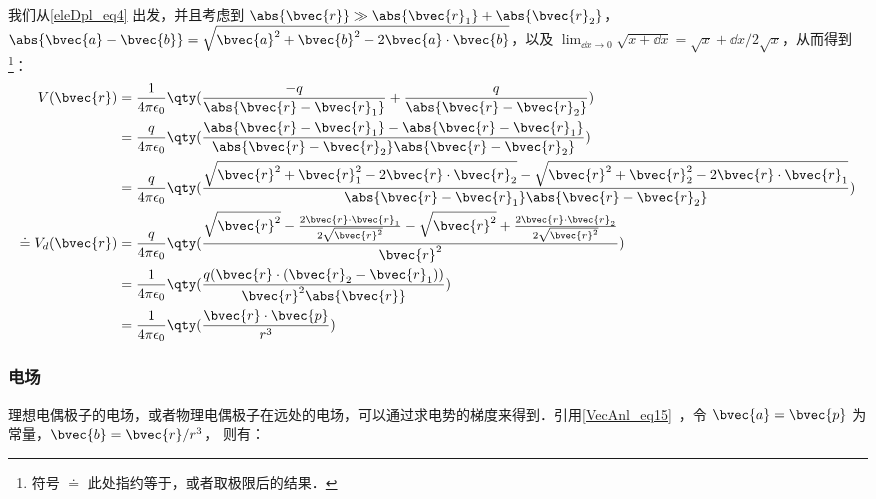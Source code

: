 我们从\autoref{eleDpl_eq4} 出发，并且考虑到 $\abs{\bvec{r}}\gg\\\abs{\bvec{r}_1}+\abs{\bvec{r}_2}$，$\abs{\bvec{a}-\bvec{b}}=\sqrt{\bvec{a}^2+\bvec{b}^2-2\bvec{a}\cdot\bvec{b}}$，以及 $\lim_{\dd x\rightarrow 0}\sqrt{x+\dd x}=\sqrt{x}+\dd x/2\sqrt{x}$，从而得到\footnote{符号 $\doteq$ 此处指约等于，或者取极限后的结果．}：
\begin{equation}
\begin{aligned}
V(\bvec{r})&=\frac{1}{4\pi\epsilon_0}\qty(\frac{-q}{\abs{\bvec{r}-\bvec{r}_1}}+\frac{q}{\abs{\bvec{r}-\bvec{r}_2}})\\
&=\frac{q}{4\pi\epsilon_0}\qty(\frac{\abs{\bvec{r}-\bvec{r}_1}-\abs{\bvec{r}-\bvec{r}_1}}{\abs{\bvec{r}-\bvec{r}_2}\abs{\bvec{r}-\bvec{r}_2}})\\
&=\frac{q}{4\pi\epsilon_0}\qty(\frac{\sqrt{\bvec{r}^2+\bvec{r}_1^2-2\bvec{r}\cdot\bvec{r}_2}-\sqrt{\bvec{r}^2+\bvec{r}_2^2-2\bvec{r}\cdot\bvec{r}_1}}{\abs{\bvec{r}-\bvec{r}_1}\abs{\bvec{r}-\bvec{r}_2}})\\
\doteq V_d(\bvec{r})&=\frac{q}{4\pi\epsilon_0}\qty(\frac{\sqrt{\bvec{r}^2}-\frac{2\bvec{r}\cdot\bvec{r}_1}{2\sqrt{\bvec{r}^2}}-\sqrt{\bvec{r}^2}+\frac{2\bvec{r}\cdot\bvec{r}_2}{2\sqrt{\bvec{r}^2}}}{\bvec{r}^2})\\
&=\frac{1}{4\pi\epsilon_0}\qty(\frac{q(\bvec{r}\cdot(\bvec{r}_2-\bvec{r}_1))}{\bvec{r}^2\abs{\bvec{r}}})\\
&=\frac{1}{4\pi\epsilon_0}\qty(\frac{\bvec{r}\cdot\bvec{p}}{r^3})
\end{aligned}
\end{equation}



\subsubsection{电场}

理想电偶极子的电场，或者物理电偶极子在远处的电场，可以通过求电势的梯度来得到．引用\autoref{VecAnl_eq15}~，令 $\bvec{a}=\bvec{p}$ 为常量，$\bvec{b}=\bvec{r}/r^3$， 则有：

